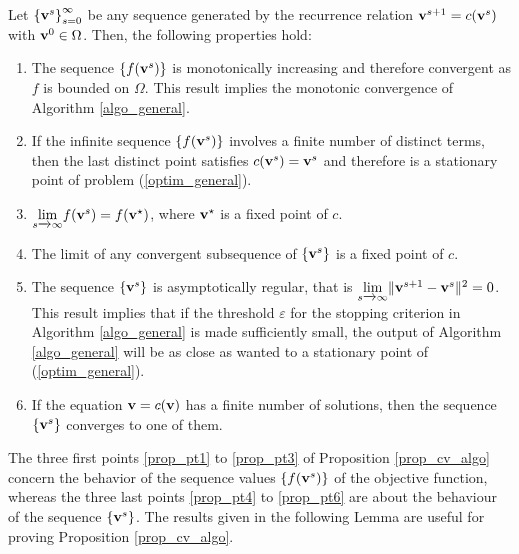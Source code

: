 \documentclass[
]{jss}
\begin{document}
\begin{proposition}
Let $\left \lbrace \mathbf{v}^s \right\rbrace_{s=0}^{\infty}$ be any sequence 
generated by the recurrence relation $\mathbf{v}^{s+1} = c(\mathbf{v}^s)$ with 
$\mathbf{v}^0\in\Omega$. Then, the following properties hold:

\begin{enumerate}[label=\alph*.]
        \item \label{prop_pt1} The sequence $\left\lbrace f(\mathbf{v}^s)\right\rbrace$ 
        is monotonically increasing and therefore convergent as $f$ is bounded on 
        $\Omega$. This result implies the monotonic convergence of Algorithm 
        \ref{algo_general}.

        \item \label{prop_pt2} If the infinite sequence 
        $\left\lbrace f(\mathbf{v}^s)\right\rbrace $ involves a finite number of distinct 
        terms, then the last distinct point satisfies $c(\mathbf{v}^s) = \mathbf{v}^s$ and 
        therefore is a stationary point of problem (\ref{optim_general}). 

        \item \label{prop_pt3} 
        $\underset{s\xrightarrow[]{}\infty}\lim{f(\ensuremath{\mathbf{v}}^s) = f(\ensuremath{\mathbf{v^\star}})}$, 
        where $\mathbf{v}^\star$ is a fixed point of $c$.

        \item \label{prop_pt4} The limit of any convergent subsequence of 
        $\left\lbrace \mathbf{v}^s\right\rbrace $ is a fixed point of $c$.

        \item \label{prop_pt5} The sequence $\lbrace \mathbf{v}^s \rbrace$ is 
        asymptotically regular, that is 
        $\underset{s\xrightarrow[]{}\infty}\lim{\Vert \ensuremath{\mathbf{v}}^{s+1} - \ensuremath{\mathbf{v}}^s \Vert^2} = 0$. 
        This result implies that if the threshold $\varepsilon$ for the stopping 
        criterion in Algorithm \ref{algo_general} is made sufficiently small, the 
        output of Algorithm \ref{algo_general} will be as close as wanted to a 
        stationary point of (\ref{optim_general}). 

        \item \label{prop_pt6} If the equation $\mathbf{v} = c(\mathbf{v})$ has a finite number 
        of solutions, then the sequence $\left\lbrace \mathbf{v}^s\right\rbrace $ converges 
        to one of them.
\end{enumerate}
\label{prop_cv_algo}
\end{proposition}

The three first points \ref{prop_pt1} to \ref{prop_pt3} of Proposition
\ref{prop_cv_algo} concern the behavior of the sequence values
\(\left\lbrace f(\mathbf{v}^s) \right\rbrace\) of the objective function,
whereas the three last points \ref{prop_pt4} to \ref{prop_pt6} are about
the behaviour of the sequence \(\left\lbrace \mathbf{v}^s \right\rbrace\).
The results given in the following Lemma are useful for proving
Proposition \ref{prop_cv_algo}.
\end{document}
